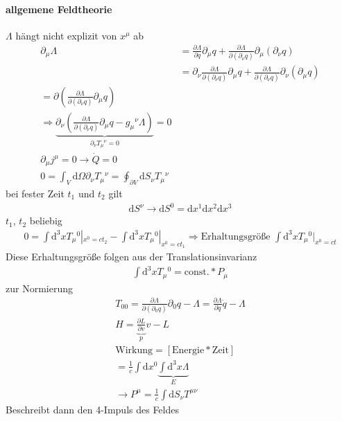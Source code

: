 \documentclass[a4paper]{article}
\begin{document}
\paragraph{allgemene Feldtheorie}
$\Lambda$ hängt nicht explizit von $x^\mu$ ab
\begin{align}
\partial_\mu \Lambda &= \frac{\partial \Lambda}{\partial q}
\partial_\mu\!q+\frac{\partial \Lambda}{\partial(\partial_\nu
q)}\partial_\mu(\partial_\nu q)\\
&=\partial_\nu \frac{\partial \Lambda}{\partial (\partial_\nu q)}
\partial_\mu\!q+\frac{\partial \Lambda}{\partial(\partial_\nu
q)}\partial_\nu(\partial_\mu q)\\
=\partial\left( \frac{\partial \Lambda}{\partial(\partial_\nu q)}\partial_\mu q
\right)\\
\Rightarrow \underbrace{\partial_\nu \left( \frac{\partial
\Lambda}{\partial(\partial_\nu q)}\partial_\mu q - g_\mu{}^\nu \Lambda
\right)}_{\partial_\nu T_\mu{}^\nu=0}=0\\
\partial_\mu j^\mu=0 \rightarrow \dot{Q}=0\\
0=\int_V \mathrm{d}\Omega \partial_\nu T_\mu{}^{\nu}=\oint_{\partial V} \mathrm{d}S_\nu
T_\mu{}^\nu
\end{align}
bei fester Zeit $t_1$ und $t_2$ gilt 
\begin{align}
\mathrm{d}S^\nu \rightarrow \mathrm{d}S^0=\mathrm{d}x^1\mathrm{d}x^2\mathrm{d}x^3
\end{align}
$t_1$, $t_2$ beliebig
\begin{align}
0=\int \mathrm{d}^3x T_\mu{}^0|_{x^0=ct_2}-\int \mathrm{d}^3x T_\mu{}^0|_{x^0=ct_1}
\Rightarrow \text{Erhaltungsgröße } \int \mathrm{d}^3x T_\mu{}^0|_{x^0=ct}
\end{align}
Diese Erhaltungsgröße folgen aus der Translationsinvarianz
\begin{align}
\int \mathrm{d}^3x T_\mu{}^0=\text{const.}* P_\mu
\end{align}
zur Normierung
\begin{align}
T_{00}=\frac{\partial \Lambda}{\partial(\partial_0 q)}\partial_0 q
-\Lambda=\frac{\partial \Lambda}{\partial \dot{q}}\dot{q}-\Lambda\\
H=\underbrace{\frac{\partial L}{\partial v}}_{p} v-L\\
\text{Wirkung}=\left[ \text{Energie}*\text{Zeit}\right]\\
=\frac{1}{c}\int \mathrm{d}x^0\underbrace{\int \mathrm{d}^3x\Lambda}_{E}\\
\rightarrow P^\mu=\frac{1}{c}\int \mathrm{d}S_\nu T^{\mu\nu}
\end{align}
Beschreibt dann den 4-Impuls des Feldes
\end{document}
